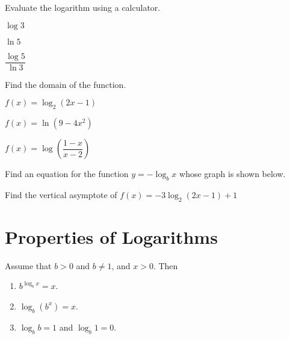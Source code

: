 \begin{exercise}
  Evaluate the logarithm using a calculator.\\
  \begin{enumerate*}
    \item $\log 3$
    \item $\ln 5$
    \item $\dfrac{\log 5}{\ln 3}$
    \hfill\null
  \end{enumerate*}
\end{exercise}
\vspace*{-0.05\textheight}

\begin{exercise}
  Find the domain of the function.\\
  \begin{enumerate*}
    \item $f(x)=\log_2(2x-1)$
    \item $f(x)=\ln(9-4x^2)$
    \item $f(x)=\log\left(\dfrac{1-x}{x-2}\right)$\hfill\null
  \end{enumerate*}
\end{exercise}
\begin{exercise}
  Find an equation for the function $y=-\log_bx$ whose graph is shown below.\\
\end{exercise}
\vspace*{-0.1\textheight}

\begin{exercise}
  Find the vertical asymptote of $f(x)=-3\log_2(2x-1)+1$
\end{exercise}

\newpage
\section{Properties of Logarithms}

\begin{proposition}
 Assume that $b>0$ and $b\neq 1$, and $x>0$. Then

\begin{enumerate}
\item
  $b^{\log_bx}=x$.
\item
  $\log_b(b^x)=x$.
\item
  $\log_bb=1$ and $\log_b1=0$.
\end{enumerate}
\end{proposition}

